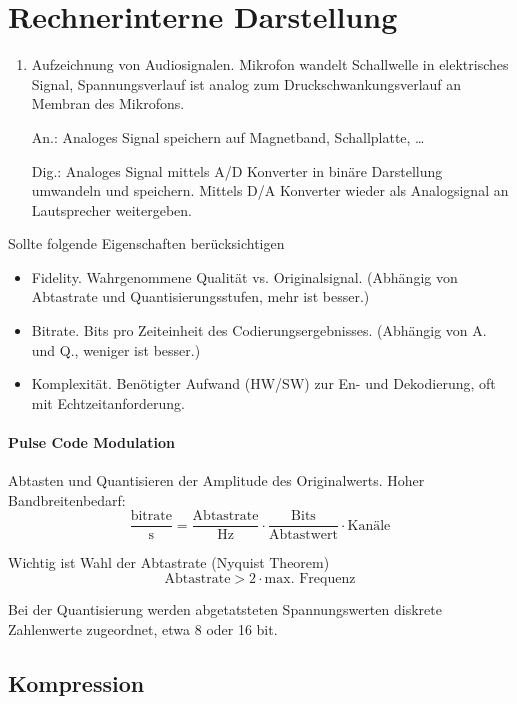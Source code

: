 \documentclass[twocolumn]{article}
\begin{document}
\section{Rechnerinterne Darstellung}

\begin{enumerate}
    \item Aufzeichnung von Audiosignalen. Mikrofon wandelt Schallwelle in elektrisches Signal, Spannungsverlauf ist analog zum Druckschwankungsverlauf an Membran des Mikrofons.
    \item[An.:] Analoges Signal speichern auf Magnetband, Schallplatte, \ldots
    \item[Dig.:] Analoges Signal mittels A/D Konverter in binäre Darstellung umwandeln und speichern. Mittels D/A Konverter wieder als Analogsignal an Lautsprecher weitergeben.
\end{enumerate}

Sollte folgende Eigenschaften berücksichtigen
\begin{itemize}
    \item Fidelity. Wahrgenommene Qualität vs. Originalsignal. (Abhängig von Abtastrate und Quantisierungsstufen, mehr ist besser.)
    \item Bitrate. Bits pro Zeiteinheit des Codierungsergebnisses. (Abhängig von A. und Q., weniger ist besser.)
    \item Komplexität. Benötigter Aufwand (HW/SW) zur En- und Dekodierung, oft mit Echtzeitanforderung.
\end{itemize}

\paragraph{Pulse Code Modulation} Abtasten und Quantisieren der Amplitude des Originalwerts. Hoher Bandbreitenbedarf:
\begin{equation*}
    \frac{\text{bitrate}}{\text{s}} = \frac{\text{Abtastrate}}{\text{Hz}} \cdot \frac{\text{Bits}}{\text{Abtastwert}} \cdot \text{Kanäle}
\end{equation*}

Wichtig ist Wahl der Abtastrate (Nyquist Theorem)
\begin{equation*}
    \text{Abtastrate} > 2 \cdot \text{max. Frequenz}
\end{equation*}

Bei der Quantisierung werden abgetatsteten Spannungswerten diskrete Zahlenwerte zugeordnet, etwa 8 oder 16 bit.

\subsection{Kompression}
\end{document}

